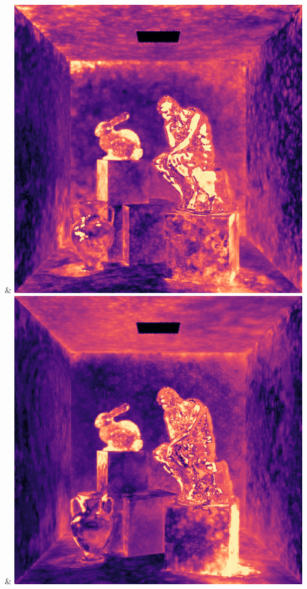 & \includegraphics[width=\linewidth]{figures/py/tests/batch_size/100+nrc+pt+14@4_1spp_flip.png}
& \includegraphics[width=\linewidth]{figures/py/tests/batch_size/500+nrc+pt+14@4_1spp_flip.png}
